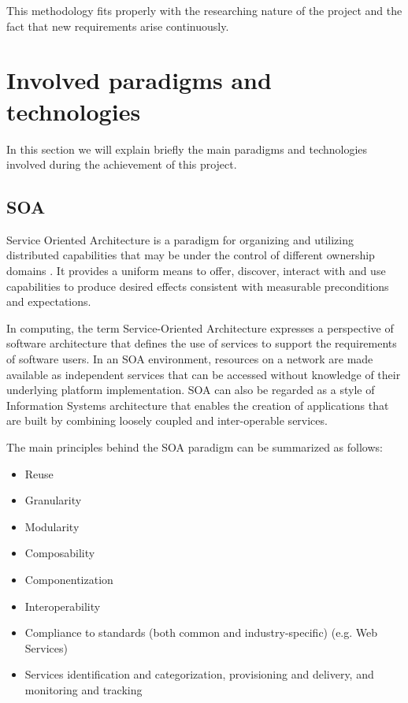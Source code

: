 This methodology fits properly with the researching
nature of the project and the fact that new requirements arise continuously.


\section{Involved paradigms and technologies}

In this section we will explain briefly the main paradigms and technologies
involved during the achievement of this project.

\subsection{SOA}

Service Oriented Architecture is a paradigm for organizing and utilizing distributed capabilities 
that may be under the control of different ownership domains \cite{soa-principles}.
It provides a uniform means to offer, discover, interact with and use capabilities to produce 
desired effects consistent with measurable preconditions and expectations.
\par
In computing, the term Service-Oriented Architecture expresses a perspective
of software architecture that defines the use of services to support the requirements of software 
users. In an SOA environment, resources on a network are made available as independent services 
that can be accessed without knowledge of their underlying platform implementation.
SOA can also be regarded as a style of Information Systems architecture that
enables the creation of applications that are built by combining loosely coupled and 
inter-operable services.

The main principles behind the SOA paradigm can be summarized as follows:

\begin{itemize}
	\item Reuse
	\item Granularity
	\item Modularity
	\item Composability
	\item Componentization
	\item Interoperability
	\item Compliance to standards (both common and industry-specific) (e.g. Web
Services) 
	\item Services identification and categorization, provisioning and delivery,
and monitoring and tracking
\end{itemize}

